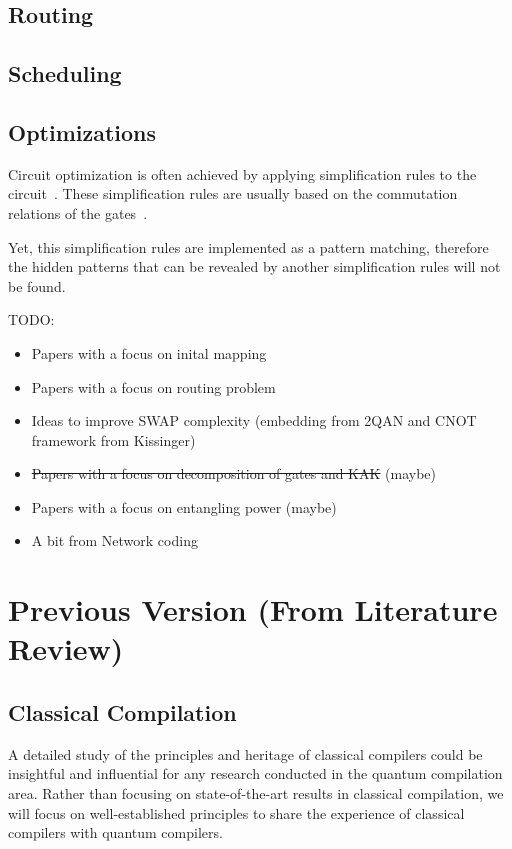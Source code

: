 \documentclass{report}
\begin{document}
\subsection{Routing}

\subsection{Scheduling}

\subsection{Optimizations}

Circuit optimization is often achieved by applying simplification rules to the circuit~\cite{pointing2021}. These simplification rules are usually based on the commutation relations of the gates~\cite{itoko2019}.

Yet, this simplification rules are implemented as a pattern matching, therefore the hidden patterns that can be revealed by another simplification rules will not be found.


TODO:
\begin{itemize}
  \item Papers with a focus on inital mapping \cite{siraichi2018,zhang2021,paler2019}
  \item Papers with a focus on routing problem \cite{childs,zhou2020,itoko2019,cowtan2019}
  \item Ideas to improve SWAP complexity (embedding from 2QAN and CNOT framework from Kissinger) \cite{lao2021}\cite{nash2020,kissinger2019}
  \item \sout{Papers with a focus on decomposition of gates and KAK} (maybe) \cite{tucci2005,vatan2004a}
  \item Papers with a focus on entangling power (maybe) \cite{nielsen2003,berry2002,bennett2002,linowski2020}
  \item A bit from Network coding \cite{ho2008}
\end{itemize}

\section{Previous Version (From Literature Review)}

\subsection{Classical Compilation}
A detailed study of the principles and heritage of classical compilers could be insightful and influential for any research conducted in the quantum compilation area. Rather than focusing on state-of-the-art results in classical compilation, we will focus on well-established principles to share the experience of classical compilers with quantum compilers.
\end{document}
